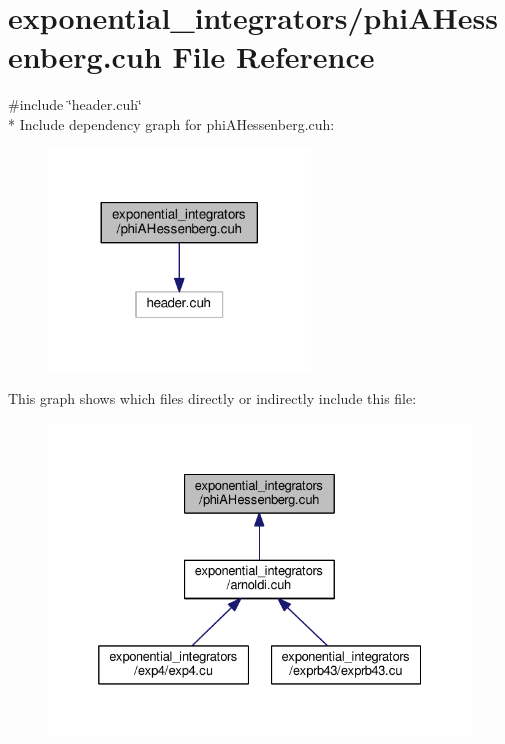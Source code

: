 \hypertarget{phiAHessenberg_8cuh}{}\section{exponential\+\_\+integrators/phi\+A\+Hessenberg.cuh File Reference}
\label{phiAHessenberg_8cuh}
{\ttfamily \#include \char`\"{}header.\+cuh\char`\"{}}\\*
Include dependency graph for phi\+A\+Hessenberg.\+cuh\+:\nopagebreak
\begin{figure}[H]
\begin{center}
\leavevmode
\includegraphics[width=197pt]{phiAHessenberg_8cuh__incl}
\end{center}
\end{figure}
This graph shows which files directly or indirectly include this file\+:\nopagebreak
\begin{figure}[H]
\begin{center}
\leavevmode
\includegraphics[width=332pt]{phiAHessenberg_8cuh__dep__incl}
\end{center}
\end{figure}
